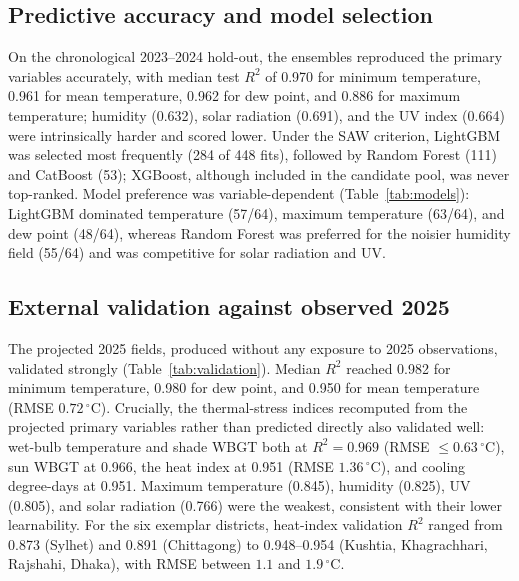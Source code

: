 \documentclass[pdflatex,sn-basic,lineno]{sn-jnl}
\newcommand{\degC}{\ensuremath{^{\circ}\mathrm{C}}}
\begin{document}
\subsection{Predictive accuracy and model selection}\label{sec:res-models}
On the chronological 2023--2024 hold-out, the ensembles reproduced the primary
variables accurately, with median test $R^{2}$ of 0.970 for minimum temperature,
0.961 for mean temperature, 0.962 for dew point, and 0.886 for maximum
temperature; humidity (0.632), solar radiation (0.691), and the UV index (0.664)
were intrinsically harder and scored lower. Under the SAW criterion, LightGBM was
selected most frequently (284 of 448 fits), followed by Random Forest (111) and
CatBoost (53); XGBoost, although included in the candidate pool, was never
top-ranked. Model preference was variable-dependent (Table~\ref{tab:models}):
LightGBM dominated temperature (57/64), maximum temperature (63/64), and dew
point (48/64), whereas Random Forest was preferred for the noisier humidity
field (55/64) and was competitive for solar radiation and UV.

\begin{table}[htbp]
\centering
\caption{Best-model selection frequency across the 64 districts, by variable
(SAW criterion). XGBoost was never selected and is omitted.}
\label{tab:models}

\end{table}

\subsection{External validation against observed 2025}\label{sec:res-val}
The projected 2025 fields, produced without any exposure to 2025 observations,
validated strongly (Table~\ref{tab:validation}). Median $R^{2}$ reached 0.982 for
minimum temperature, 0.980 for dew point, and 0.950 for mean temperature (RMSE
$0.72\,\degC$). Crucially, the thermal-stress indices recomputed from the
projected primary variables rather than predicted directly also validated well:
wet-bulb temperature and shade WBGT both at $R^{2}=0.969$ (RMSE $\le
0.63\,\degC$), sun WBGT at 0.966, the heat index at 0.951 (RMSE $1.36\,\degC$),
and cooling degree-days at 0.951. Maximum temperature (0.845), humidity (0.825),
UV (0.805), and solar radiation (0.766) were the weakest, consistent with their
lower learnability. For the six exemplar districts, heat-index validation $R^{2}$
ranged from 0.873 (Sylhet) and 0.891 (Chittagong) to 0.948--0.954 (Kushtia,
Khagrachhari, Rajshahi, Dhaka), with RMSE between $1.1$ and $1.9\,\degC$.
\end{document}

